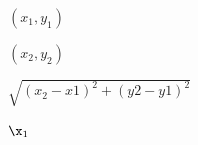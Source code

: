 \documentclass{article}
\begin{document}
$(x_1,y_1)$
\pagebreak

$(x_2,y_2)$
\pagebreak

$\sqrt{(x_2-x1)^2+(y2-y1)^2}$
\pagebreak

$\x_1$
\pagebreak
\end{document}
